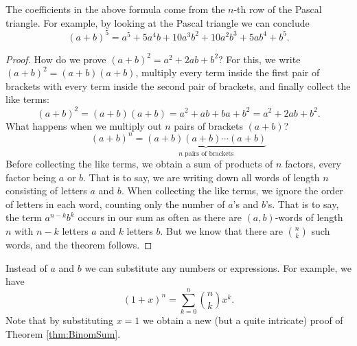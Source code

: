 

\setcounter{section}{3}
\setcounter{subsection}{4}
\setcounter{dfn}{7}


The coefficients in the above formula come from the $n$-th row of the Pascal triangle.
For example, by looking at the Pascal triangle we can conclude
\[
(a+b)^5 = a^5 + 5a^4b + 10a^3b^2 + 10a^2b^3 + 5ab^4 + b^5.
\]

\begin{proof}
How do we prove $(a+b)^2 = a^2 + 2ab + b^2$?
For this, we write $(a+b)^2 = (a+b)(a+b)$, multiply
every term inside the first pair of brackets with every term inside the second pair of brackets,
and finally collect the like terms:
\[
(a+b)^2 = (a+b)(a+b) = a^2 + ab + ba + b^2 = a^2 + 2ab + b^2.
\]
What happens when we multiply out $n$ pairs of brackets $(a+b)$?
\[
(a+b)^n = \underbrace{(a+b)(a+b) \cdots (a+b)}_{n \text{ pairs of brackets}}
\]
Before collecting the like terms, we obtain a sum of products of $n$ factors,
every factor being $a$ or $b$.
That is to say, we are writing down all words of length $n$ consisting of letters $a$ and $b$.
When collecting the like terms, we ignore the order of letters in each word, counting only
the number of $a$'s and $b$'s.
That is to say, the term $a^{n-k}b^k$ occurs in our sum as often as
there are $(a,b)$-words of length $n$ with $n-k$ letters $a$ and $k$ letters $b$.
But we know that there are $\binom{n}{k}$ such words, and the theorem follows.
\end{proof}

Instead of $a$ and $b$ we can substitute any numbers or expressions.
For example, we have
\[
(1+x)^n = \sum_{k=0}^n \binom{n}{k} x^k.
\]
Note that by substituting $x=1$ we obtain a new (but a quite intricate) proof of Theorem \ref{thm:BinomSum}.



